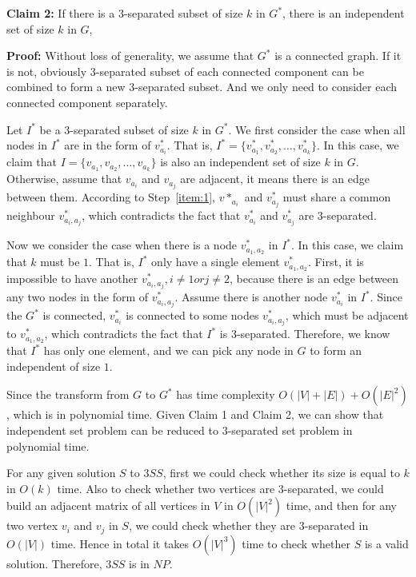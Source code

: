 \documentclass[paper=a4, fontsize=11pt]{scrartcl} %
\numberwithin{equation}{section} %
\numberwithin{figure}{section} %
\numberwithin{table}{section} %
\begin{document}
\vspace{0.2cm}
\textbf{Claim 2:}
If there is a $3$-separated subset of size $k$ in $G^*$, there is an independent set of size $k$ in $G$,   

\textbf{Proof:}
Without loss of generality, we assume that $G^*$ is a connected graph. If it is not, obviously 
$3$-separated subset of each connected component can be combined to form a new $3$-separated subset.
And we only need to consider each connected component separately. 

\vspace{0.2cm}
Let $I^*$ be a $3$-separated subset of size $k$ in $G^*$.  
We first consider the case when all nodes in $I^*$ are in the form of $v^*_{a_i}$. That is,
$I^* = \{v_{a_1}^*,  v_{a_2}^*,\dots, v_{a_k}^*\}$. In this case, we claim that 
$I = \{v_{a_1}, v_{a_2}, \dots, v_{a_k}\}$ is also an independent set of size $k$ in $G$. Otherwise,
assume that $v_{a_i}$ and $v_{a_j}$ are adjacent, it means there is an edge between them. According
to Step~\ref{item:1}, $v*_{a_i}$ and $v^*_{a_j}$  must share a common neighbour $v^*_{a_i, a_j}$,
which contradicts the fact that $v^*_{a_i}$ and $v^*_{a_j}$ are $3$-separated.

\vspace{0.2cm}
Now we consider the case when there is a node $v^*_{a_1, a_2}$ in $I^*$. In this case, we claim that 
$k$ must be $1$. That is, $I^*$ only have a single element $v^*_{a_1, a_2}$. First, it is impossible
to have another $v^*_{a_i, a_j}, i \neq 1 or j \neq 2$, because there is an edge between any two
nodes in the form of $v^*_{a_i, a_j}$. Assume there is another node $v^*_{a_i}$ in $I^*$. Since the
$G^*$ is connected, $v^*_{a_i}$ is connected to some nodes $v^*_{a_i, a_j}$, which must be adjacent
to $v^*_{a_1, a_2}$, which contradicts the fact that $I^*$ is $3$-separated. Therefore, we know that 
$I^*$ has only one element, and we can pick any node in $G$ to form an independent of size $1$.

\vspace{0.2cm}
Since the transform from $G$ to $G^*$ has time complexity $O(|V| + |E|) + O(|E|^2)$,
which is in polynomial time.  
Given Claim 1 and Claim 2, we can show that independent set problem can be reduced to $3$-separated
set problem in polynomial time. 

For any given solution $S$ to $3SS$, first we could check whether 
its size is equal to $k$ in $O(k)$ time. Also to check whether two vertices are $3$-separated, we
could build an adjacent matrix of all vertices in $V$ in $O(|V|^2)$ time, and then for any two
vertex $v_i$ and $v_j$ in $S$, we could check whether they are $3$-separated in $O(|V|)$ time. Hence
in total it takes $O(|V|^3)$ time to check whether $S$ is a valid solution. Therefore, $3SS$ is in
$NP$.
\end{document}
